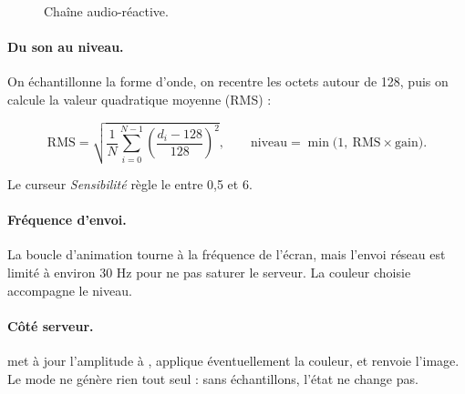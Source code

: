 \begin{figure}[H]
  \centering
  \caption{Chaîne audio-réactive.}
  \label{fig:audio}
\end{figure}

\paragraph{Du son au niveau.} On échantillonne la forme d'onde, on recentre les
octets autour de 128, puis on calcule la valeur quadratique moyenne (RMS) :

\begin{equation*}
\mathrm{RMS} = \sqrt{\frac{1}{N}\sum_{i=0}^{N-1} \left(\frac{d_i - 128}{128}\right)^2 },
\qquad
\text{niveau} = \min\!\big(1,\ \mathrm{RMS} \times \text{gain}\big).
\end{equation*}

Le curseur \emph{Sensibilité} règle le  entre 0,5 et 6.

\paragraph{Fréquence d'envoi.} La boucle d'animation tourne à la fréquence de
l'écran, mais l'envoi réseau est limité à environ 30 Hz pour ne pas saturer le
serveur. La couleur choisie accompagne le niveau.

\paragraph{Côté serveur.}  met à jour
l'amplitude à , applique éventuellement la couleur, et
renvoie l'image. Le mode ne génère rien tout seul : sans échantillons, l'état
ne change pas.
